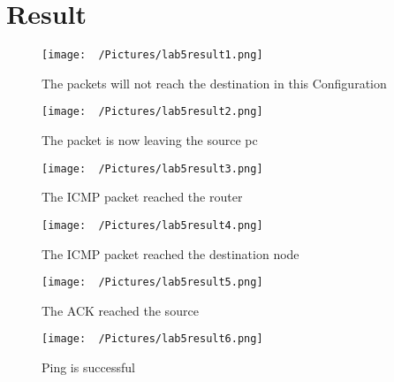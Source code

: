 \documentclass{article}
\begin{document}
\section{Result}
\begin{figure}[H]
    \centering
    \texttt{[image: ~/Pictures/lab5result1.png]}
    \caption{The packets will not reach the destination in this Configuration}
\end{figure}
\begin{figure}[H]
    \centering
    \texttt{[image: ~/Pictures/lab5result2.png]}
    \caption{The packet is now leaving the source pc}
\end{figure}
\begin{figure}[H]
    \centering
    \texttt{[image: ~/Pictures/lab5result3.png]}
    \caption{The ICMP packet reached the router}
\end{figure}
\begin{figure}[H]
    \centering
    \texttt{[image: ~/Pictures/lab5result4.png]}
    \caption{The ICMP packet reached the destination node}
\end{figure}
\begin{figure}[H]
    \centering
    \texttt{[image: ~/Pictures/lab5result5.png]}
    \caption{The ACK reached the source}
\end{figure}
\begin{figure}[H]
    \centering
    \texttt{[image: ~/Pictures/lab5result6.png]}
    \caption{Ping is successful}
\end{figure}
\end{document}
